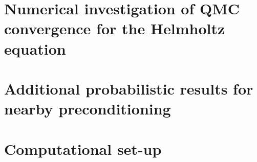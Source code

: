 \documentclass[11pt]{book}
\begin{document}
\chapter[Numerical investigation of QMC]{Numerical investigation of QMC convergence for the Helmholtz equation}\label{app:hhqmcconv}


\chapter[Additional probabilistic results]{Additional probabilistic results for nearby preconditioning}\label{app:probnbpc}


\chapter{Computational set-up}\label{app:compsetup}




\end{document}
